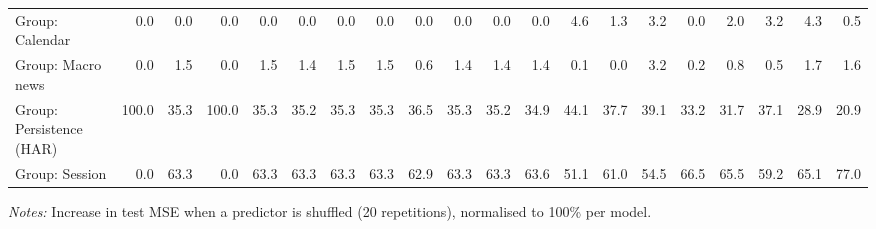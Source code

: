 \begin{table}[htbp]
{\begin{tabular}{lrrrrrrrrrrrrrrrrrrr}
Group: Calendar & 0.0 & 0.0 & 0.0 & 0.0 & 0.0 & 0.0 & 0.0 & 0.0 & 0.0 & 0.0 & 0.0 & 4.6 & 1.3 & 3.2 & 0.0 & 2.0 & 3.2 & 4.3 & 0.5 \\
Group: Macro news & 0.0 & 1.5 & 0.0 & 1.5 & 1.4 & 1.5 & 1.5 & 0.6 & 1.4 & 1.4 & 1.4 & 0.1 & 0.0 & 3.2 & 0.2 & 0.8 & 0.5 & 1.7 & 1.6 \\
Group: Persistence (HAR) & 100.0 & 35.3 & 100.0 & 35.3 & 35.2 & 35.3 & 35.3 & 36.5 & 35.3 & 35.2 & 34.9 & 44.1 & 37.7 & 39.1 & 33.2 & 31.7 & 37.1 & 28.9 & 20.9 \\
Group: Session & 0.0 & 63.3 & 0.0 & 63.3 & 63.3 & 63.3 & 63.3 & 62.9 & 63.3 & 63.3 & 63.6 & 51.1 & 61.0 & 54.5 & 66.5 & 65.5 & 59.2 & 65.1 & 77.0 \\
\bottomrule
\end{tabular}%
}
\par\vspace{2pt}\footnotesize\textit{Notes:} Increase in test MSE when a predictor is shuffled (20 repetitions), normalised to 100\% per model.
\end{table}
